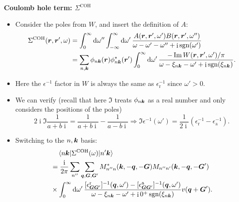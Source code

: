 \documentclass[t]{beamer}
\DeclareMathOperator{\ii}{i}
\DeclareMathOperator{\sgn}{sgn}
\begin{document}
\begin{frame}[allowframebreaks]
\textbf{Coulomb hole term: $\Sigma^{\text{COH}}$} 
\begin{itemize}
    \item Consider the poles from $W$, 
        and insert the definition of $A$: 
    \begin{equation}
        \begin{aligned}
            \Sigma^{\text{COH}}(\vb*{r}, \vb*{r}', \omega)
            &= \int_{0}^{\infty} \dd{\omega''} \int_{-\infty}^\infty \dd{\omega'}
            \frac{
                A(\vb*{r}, \vb*{r}', \omega') B(\vb*{r}, \vb*{r}', \omega'')
            }{
                \omega - \omega' - \omega'' + \ii \sgn(\omega')
            } \\ 
            &= \sum_{n, \vb*{k}} \phi_{n \vb*{k}}(\vb*{r}) \phi_{n \vb*{k}}^*(\vb*{r}')
            \int_{0}^{\infty} \dd{\omega'}
            \frac{- \Im W(\vb*{r}, \vb*{r}', \omega') / \pi}{\omega - \xi_{n \vb*{k}} - \omega' + \ii \sgn(\xi_{n \vb*{k}})}.
        \end{aligned}
    \end{equation}
    \item Here the $\epsilon^{-1}$ factor in $W$ 
        is always the same as $\epsilon^{-1}_{\text{r}}$ since $\omega' > 0$.
    \item We can verify (recall that here $\Im$ treats $\phi_{n \vb*{k}}$ as a real number 
    and only considers the positions of the poles)
        \[
            2 \ii \Im \frac{1}{a + b \ii} = \frac{1}{a + b \ii} - \frac{1}{a - b \ii}
            \Rightarrow \Im \epsilon^{-1}(\omega')
            = \frac{1}{2\ii} (\epsilon^{-1}_{\text{r}} - \epsilon^{-1}_{\text{a}}).
        \]
    \item Switching to the $n, \vb*{k}$ basis: 
    \begin{equation}
        \begin{aligned}
            &\quad \mel{n \vb*{k}}{\Sigma^{\text{COH}}(\omega)}{n' \vb*{k}} \\
            &= \frac{\ii}{2\pi} \sum_{n''} \sum_{\vb*{q}, \vb*{G}, \vb*{G}'} 
            M^*_{n'' n} (\vb*{k}, - \vb*{q}, - \vb*{G})  M_{n'' n'} (\vb*{k}, - \vb*{q},  -\vb*{G}') \\
            & \times \int_{0}^{\infty} \dd{\omega'} 
            \frac{
                [\epsilon^{\text{r}}_{\vb*{G} \vb*{G}'}]^{-1} (\vb*{q}, \omega')
                - [\epsilon^{\text{a}}_{\vb*{G} \vb*{G}'}]^{-1} (\vb*{q}, \omega') 
            }{\omega - \xi_{n \vb*{k}} - \omega' + \ii 0^+ \sgn(\xi_{n \vb*{k}})} v(\vb*{q}+\vb*{G}') .
        \end{aligned}
        \label{eq:coh}
    \end{equation}
\end{itemize}


\end{frame}
\end{document}
